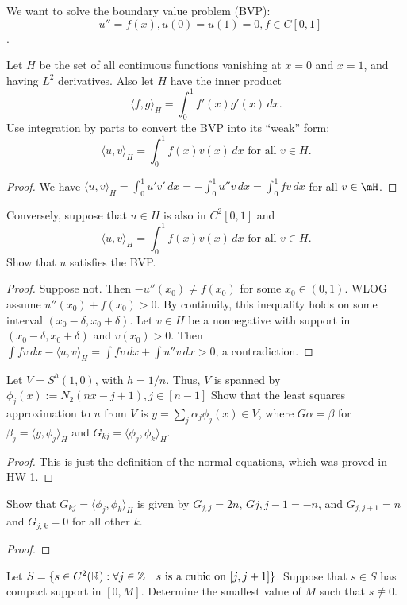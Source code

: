 \documentclass{article}
\begin{document}
 We want to solve the boundary value problem (BVP): 
$$-u'' = f(x), u(0) = u(1) = 0, f \in C[0,1]$$.

 Let $H$ be the set of all continuous functions vanishing at $x = 0$ and $x = 1$, and having $L^2$ derivatives. Also let $H$ have the inner product
$$\langle f, g \rangle_H = \int_0^1 f'(x) g'(x) \, dx.$$
Use integration by parts to convert the BVP into its ``weak'' form:
$$\langle u, v \rangle_H = \int_0^1 f(x) v(x) \, dx \text{ for all } v \in H.$$
\begin{proof}
We have $\langle u, v \rangle_H = \int_0^1 u' v' \, dx =  - \int_0^1 u'' v \, dx = \int_0^1 f v \, dx$ for all $v \in \mH$.
\end{proof}

 Conversely, suppose that $u \in H$ is also in $C^2[0,1]$ and 
$$\langle u, v \rangle_H  = \int_0^1 f(x) v(x) \, dx \text{ for all } v \in H.$$
Show that $u$ satisfies the BVP.
\begin{proof}
Suppose not. Then $-u''(x_0) \neq f(x_0)$ for some $x_0 \in (0,1)$. WLOG assume $u''(x_0) + f(x_0) > 0$.  By continuity, this inequality holds on some interval $(x_0 - \delta, x_0 + \delta)$. Let $v \in H$ be a nonnegative with support in $(x_0 - \delta, x_0 + \delta)$ and $v(x_0) > 0$.  Then $\int f v \, dx - \langle u, v \rangle_H = \int f v \, dx + \int u'' v \, dx  > 0$, a contradiction.
\end{proof}


 Let $V = S^h(1,0)$, with $h = 1/n$. Thus, $V$ is spanned by $\phi_j(x) := N_2(nx - j+1), j \in [n-1]$ Show that the least squares approximation to $u$ from $V$ is $y = \sum_j \alpha_j \phi_j(x) \in V$, where $G \alpha = \beta$ for $\beta_j = \langle y , \phi_j \rangle_H$ and $G_{kj} = \langle \phi_j, \phi_k \rangle_H$.

\begin{proof}
This is just the definition of the normal equations, which was proved in HW 1.
\end{proof}

 Show that $G_{kj} = \langle \phi_j, \phi_k \rangle_H$ is given by
$G_{j,j} = 2n$, $G{j,j-1} = -n$, and $G_{j, j+1} = n$ and $G_{j,k} = 0$ for all other $k$.
\begin{proof}


\end{proof}


 Let $S = \{ s \in C^2(\mathbb{R}) : \forall j \in \mathbb{Z} \quad s \text{ is a cubic on } [j, j+1] \}$.  Suppose that $s \in S$ has compact support in $[0,M]$. Determine the smallest value of $M$ such that $s \not \equiv 0$.
\end{document}
